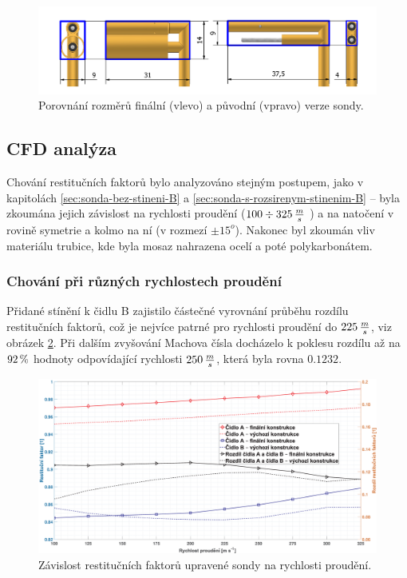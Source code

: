         

        \begin{figure}[ht!]
            \centering
            \includegraphics[width=\textwidth]{500_FINAL/porovnani_v01_final.png}
            \caption{Porovnání rozměrů finální (vlevo) a původní (vpravo) verze sondy.}
            \label{fig:sonda-final-porovnani}
        \end{figure}
        
    \subsection{CFD analýza}
        Chování restitučních faktorů bylo analyzováno stejným postupem, jako v kapitolách \ref{sec:sonda-bez-stineni-B} a \ref{sec:sonda-s-rozsirenym-stinenim-B} – byla zkoumána jejich závislost na rychlosti proudění ($100 \div 325 \, \frac{m}{s}$ ) a na natočení v rovině symetrie a kolmo na ní (v rozmezí $\pm 15^o$). Nakonec byl zkoumán vliv materiálu trubice, kde byla mosaz nahrazena ocelí a poté polykarbonátem.
        \subsubsection{Chování při různých rychlostech proudění}
            Přidané stínění k čidlu B zajistilo částečné vyrovnání průběhu rozdílu restitučních faktorů, což je nejvíce patrné pro rychlosti proudění do $225 \, \frac{m}{s}$, viz obrázek \ref{fig:sonda-final-rychlosti}. Při dalším zvyšování Machova čísla docházelo k poklesu rozdílu až na $92 \, \%$ hodnoty odpovídající rychlosti $250 \, \frac{m}{s}$, která byla rovna $0.1232$. 
            \begin{figure}[ht!]
                \centering
                \includegraphics*[width=\textwidth]{500_FINAL/final_rychlosti.eps}
                \caption{Závislost restitučních faktorů upravené sondy na rychlosti proudění.}
                \label{fig:sonda-final-rychlosti}
            \end{figure}

